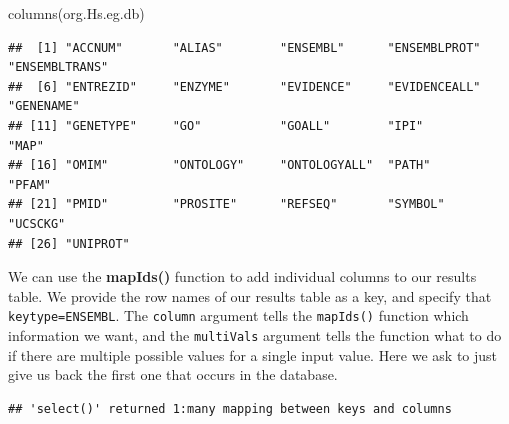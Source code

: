 \documentclass[
]{article}
\newenvironment{Shaded}{\begin{snugshade}}{\end{snugshade}}
\newcommand{\AttributeTok}[1]{\textcolor[rgb]{0.77,0.63,0.00}{#1}}
\newcommand{\CommentTok}[1]{\textcolor[rgb]{0.56,0.35,0.01}{\textit{#1}}}
\newcommand{\FunctionTok}[1]{\textcolor[rgb]{0.00,0.00,0.00}{#1}}
\newcommand{\NormalTok}[1]{#1}
\newcommand{\OtherTok}[1]{\textcolor[rgb]{0.56,0.35,0.01}{#1}}
\newcommand{\SpecialCharTok}[1]{\textcolor[rgb]{0.00,0.00,0.00}{#1}}
\newcommand{\StringTok}[1]{\textcolor[rgb]{0.31,0.60,0.02}{#1}}
\begin{document}
\begin{Shaded}
\begin{Highlighting}[]
\FunctionTok{columns}\NormalTok{(org.Hs.eg.db)}
\end{Highlighting}
\end{Shaded}

\begin{verbatim}
##  [1] "ACCNUM"       "ALIAS"        "ENSEMBL"      "ENSEMBLPROT"  "ENSEMBLTRANS"
##  [6] "ENTREZID"     "ENZYME"       "EVIDENCE"     "EVIDENCEALL"  "GENENAME"    
## [11] "GENETYPE"     "GO"           "GOALL"        "IPI"          "MAP"         
## [16] "OMIM"         "ONTOLOGY"     "ONTOLOGYALL"  "PATH"         "PFAM"        
## [21] "PMID"         "PROSITE"      "REFSEQ"       "SYMBOL"       "UCSCKG"      
## [26] "UNIPROT"
\end{verbatim}

We can use the \textbf{mapIds()} function to add individual columns to
our results table. We provide the row names of our results table as a
key, and specify that \texttt{keytype=ENSEMBL}. The \texttt{column}
argument tells the \texttt{mapIds()} function which information we want,
and the \texttt{multiVals} argument tells the function what to do if
there are multiple possible values for a single input value. Here we ask
to just give us back the first one that occurs in the database.

\begin{Shaded}
\end{Shaded}

\begin{verbatim}
## 'select()' returned 1:many mapping between keys and columns
\end{verbatim}

\begin{Shaded}
\end{Shaded}
\end{document}
